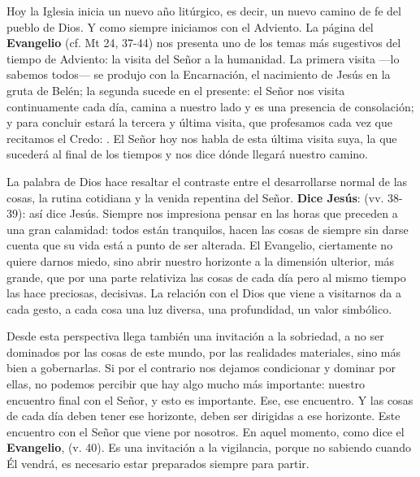 				\begin{body}
					Hoy la Iglesia inicia un nuevo año litúrgico, es decir, un nuevo camino de fe del pueblo de Dios. Y como siempre iniciamos con el Adviento. La página del \textbf{Evangelio} (cf. Mt 24, 37-44) nos presenta uno de los temas más sugestivos del tiempo de Adviento: la visita del Señor a la humanidad. La primera visita ---lo sabemos todos--- se produjo con la Encarnación, el nacimiento de Jesús en la gruta de Belén; la segunda sucede en el presente: el Señor nos visita continuamente cada día, camina a nuestro lado y es una presencia de consolación; y para concluir estará la tercera y última visita, que profesamos cada vez que recitamos el Credo: . El Señor hoy nos habla de esta última visita suya, la que sucederá al final de los tiempos y nos dice dónde llegará nuestro camino. 
					
					La palabra de Dios hace resaltar el contraste entre el desarrollarse normal de las cosas, la rutina cotidiana y la venida repentina del Señor. \textbf{Dice Jesús}:  (vv. 38-39): así dice Jesús. Siempre nos impresiona pensar en las horas que preceden a una gran calamidad: todos están tranquilos, hacen las cosas de siempre sin darse cuenta que su vida está a punto de ser alterada. El Evangelio, ciertamente no quiere darnos miedo, sino abrir nuestro horizonte a la dimensión ulterior, más grande, que por una parte relativiza las cosas de cada día pero al mismo tiempo las hace preciosas, decisivas. La relación con el Dios que viene a visitarnos da a cada gesto, a cada cosa una luz diversa, una profundidad, un valor simbólico. 
					
					Desde esta perspectiva llega también una invitación a la sobriedad, a no ser dominados por las cosas de este mundo, por las realidades materiales, sino más bien a gobernarlas. Si por el contrario nos dejamos condicionar y dominar por ellas, no podemos percibir que hay algo mucho más importante: nuestro encuentro final con el Señor, y esto es importante. Ese, ese encuentro. Y las cosas de cada día deben tener ese horizonte, deben ser dirigidas a ese horizonte. Este encuentro con el Señor que viene por nosotros. En aquel momento, como dice el \textbf{Evangelio},  (v. 40). Es una invitación a la vigilancia, porque no sabiendo cuando Él vendrá, es necesario estar preparados siempre para partir. 
					

\end{body}
